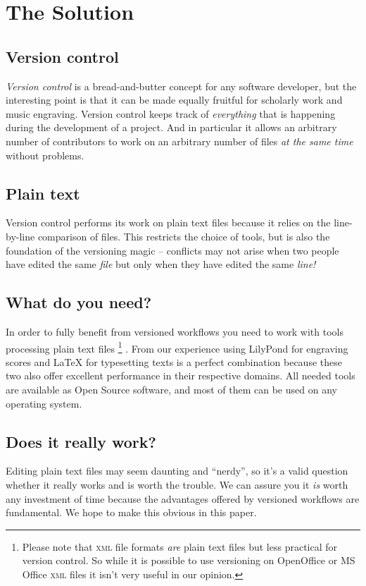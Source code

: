 \documentclass[11pt,a4paper]{article}
\begin{document}
\section{The Solution}

\subsection{Version control}
\emph{Version control} is a bread-and-butter concept for any software developer, but the
interesting point is that it can be made equally fruitful for scholarly work and music
engraving. Version control keeps track of \emph{everything} that is happening during
the development of a project. And in particular it allows an arbitrary number of contributors
to work on an arbitrary number of files \emph{at the same time} without problems.

\subsection{Plain text}
Version control performs its work on plain text files because it relies on the 
line-by-line comparison of files. This restricts the choice of tools, but is also the
foundation of the versioning magic -- conflicts may not arise when two people have edited
the same \emph{file} but only when they have edited the same \emph{line!}

\subsection{What do you need?}
In order to fully benefit from versioned
workflows you need to work with tools processing plain text files%
\footnote{Please note that \textsc{xml} file formats \emph{are} plain text files
but less practical for version control. So while it is possible to use versioning on
OpenOffice or MS Office \textsc{xml} files it isn't very useful in our opinion.}
. From our experience
using LilyPond for engraving scores and \LaTeX{} for typesetting texts is a perfect
combination because these two also offer excellent performance in their respective domains.
All needed tools are available as Open Source software, and most of them can
be used on any operating system.

\subsection{Does it really work?}
Editing plain text files may seem daunting and “nerdy”, so it's a valid question
whether it really works and is worth the trouble. We can assure you it \emph{is} worth
any investment of time because the advantages offered by versioned workflows are fundamental.
We hope to make this obvious in this paper.
\end{document}
